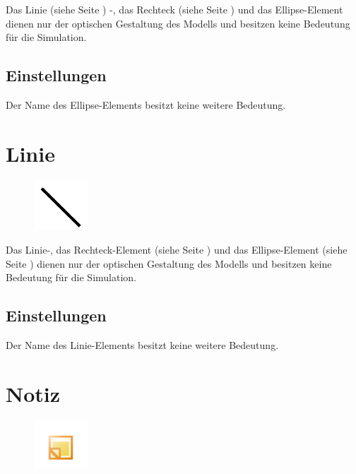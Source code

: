 Das Linie (siehe Seite \pageref{ref:ModelElementLine}) -, das Rechteck (siehe Seite \pageref{ref:ModelElementRectangle}) 
und das Ellipse-Element dienen nur der optischen Gestaltung des Modells und besitzen keine Bedeutung für die Simulation.

\subsection*{Einstellungen}

Der Name des Ellipse-Elements besitzt keine weitere Bedeutung.


\section{Linie}
\label{ref:ModelElementLine}

\begin{figure}
\vspace{-22pt}
\includegraphics[width=2cm]{imageModelElementLine.png}
\vspace{-22pt}
\end{figure}

Das Linie-, das Rechteck-Element (siehe Seite \pageref{ref:ModelElementRectangle}) und das
Ellipse-Element (siehe Seite \pageref{ref:ModelElementEllipse}) dienen nur der optischen Gestaltung
des Modells und besitzen keine Bedeutung für die Simulation.

\subsection*{Einstellungen}

Der Name des Linie-Elements besitzt keine weitere Bedeutung.


\section{Notiz}
\label{ref:ModelElementNote}

\begin{figure}
\vspace{-22pt}
\includegraphics[width=2cm]{imageModelElementNote.png}
\vspace{-22pt}
\end{figure}

